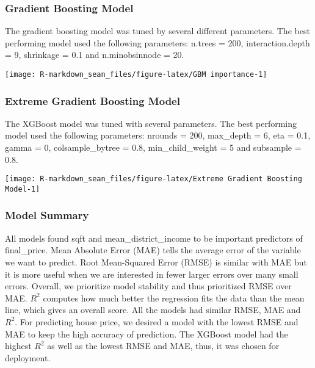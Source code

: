 \documentclass[11pt,]{article}
\begin{document}
\hypertarget{gradient-boosting-model}{%
\subsubsection{Gradient Boosting Model}\label{gradient-boosting-model}}

The gradient boosting model was tuned by several different parameters.
The best performing model used the following parameters: n.trees = 200,
interaction.depth = 9, shrinkage = 0.1 and n.minobsinnode = 20.

\begin{center}\texttt{[image: R-markdown\_sean\_files/figure-latex/GBM importance-1]} \end{center}

\hypertarget{extreme-gradient-boosting-model}{%
\subsubsection{Extreme Gradient Boosting
Model}\label{extreme-gradient-boosting-model}}

The XGBoost model was tuned with several parameters. The best performing
model used the following parameters: nrounds = 200, max\_depth = 6, eta
= 0.1, gamma = 0, colsample\_bytree = 0.8, min\_child\_weight = 5 and
subsample = 0.8.

\begin{center}\texttt{[image: R-markdown\_sean\_files/figure-latex/Extreme Gradient Boosting Model-1]} \end{center}

\hypertarget{model-summary}{%
\subsubsection{Model Summary}\label{model-summary}}

All models found sqft and mean\_district\_income to be important
predictors of final\_price. Mean Absolute Error (MAE) tells the average
error of the variable we want to predict. Root Mean-Squared Error (RMSE)
is similar with MAE but it is more useful when we are interested in
fewer larger errors over many small errors. Overall, we prioritize model
stability and thus prioritized RMSE over MAE. \(R^2\) computes how much
better the regression fits the data than the mean line, which gives an
overall score. All the models had similar RMSE, MAE and \(R^2\). For
predicting house price, we desired a model with the lowest RMSE and MAE
to keep the high accuracy of prediction. The XGBoost model had the
highest \(R^2\) as well as the lowest RMSE and MAE, thus, it was chosen
for deployment.
\end{document}
